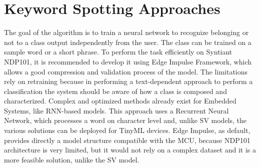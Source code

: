 \section{Keyword Spotting Approaches}
\label{subsec:kws approaches}
The goal of the algorithm is to train a neural network to recognize belonging or not to a class output independently from the user. The class can be trained on a sample word or a short phrase. To perform the task efficiently on Syntiant NDP101, it is recommended to develop it using Edge Impulse Framework, which allows a good compression and validation process of the model. The limitations rely on retraining because in performing a text-dependent approach to perform a classification the system should be aware of how a class is composed and characterized. Complex and optimized methods already exist for Embedded Systems, like RNN-based models. This approach uses a Recurrent Neural Network\cite{kws_rnn_based}, which processes a word on character level and, unlike SV models, the various solutions can be deployed for TinyML devices. Edge Impulse, as default, provides directly a model structure compatible with the MCU, because NDP101 architecture is very limited, but it would not rely on a complex dataset and it is a more feasible solution, unlike the SV model.

\newpage
